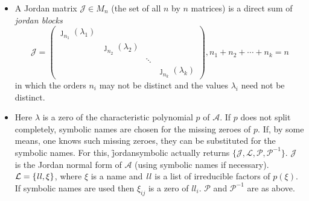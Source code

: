 \begin{description}
\begin{itemize}
\item A Jordan matrix $\mathcal{J} \in M_{n}$ (the set of all $n$ by $n$
      matrices) is a direct sum of \emph{jordan blocks}
%
      \[
      \mathcal{J} = \begin{pmatrix} \jmath_{n_1}(\lambda_{1})
      \\  & \jmath_{n_2}(\lambda_{2}) \\ & & \ddots \\ & & &
      \jmath_{n_k}(\lambda_{k}) \end{pmatrix} ,
      n_{1}+n_{2}+\cdots + n_{k} = n
      \]
%
      in which the orders $n_{i}$ may not be distinct and the
      values ${\lambda_{i}}$ need not be distinct.

\item Here ${\lambda}$ is a zero of the characteristic polynomial
      $p$ of $\mathcal{A}$. If $p$ does not split completely,
      symbolic names are chosen for the missing zeroes of $p$.
      If, by some means, one knows such missing zeroes, they can be
      substituted for the symbolic names. For this,
      \f{jordansymbolic} actually returns $\{ \mathcal{J,L,P,P}^{-1} \}$.
      $\mathcal{J}$ is the Jordan normal form of $\mathcal{A}$ (using
      symbolic names if necessary). $\mathcal{L} = \{ {\it ll}, \xi \}$,
      where $\xi$ is a name and ${\it ll}$ is a list of irreducible
      factors of $p(\xi)$. If symbolic names are used then
      ${\xi}_{ij}$ is a zero of $ll_{i}$. $\mathcal{P}$ and
      $\mathcal{P}^{-1}$ are as above.
\end{itemize}


\end{description}
